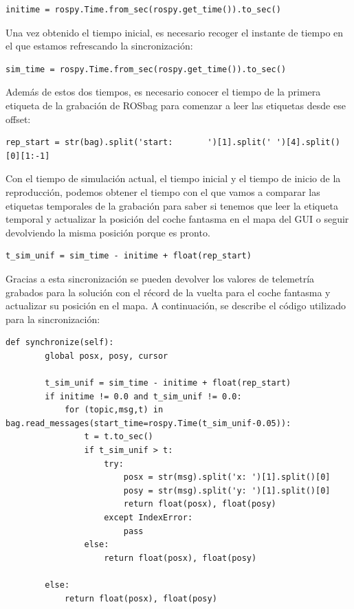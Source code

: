\lstset{language=Python, breaklines=true, basicstyle=\footnotesize}
\begin{lstlisting}[frame=single]
initime = rospy.Time.from_sec(rospy.get_time()).to_sec()
\end{lstlisting}

Una vez obtenido el tiempo inicial, es necesario recoger el instante de tiempo en el que estamos refrescando la sincronización:

\lstset{language=Python, breaklines=true, basicstyle=\footnotesize}
\begin{lstlisting}[frame=single]
sim_time = rospy.Time.from_sec(rospy.get_time()).to_sec()
\end{lstlisting}

Además de estos dos tiempos, es necesario conocer el tiempo de la primera etiqueta de la grabación de ROSbag para comenzar a leer las etiquetas desde ese offset:
\lstset{language=Python, breaklines=true, basicstyle=\footnotesize}
\begin{lstlisting}[frame=single]
rep_start = str(bag).split('start:       ')[1].split(' ')[4].split()[0][1:-1]
\end{lstlisting}
Con el tiempo de simulación actual, el tiempo inicial y el tiempo de inicio de la reproducción, podemos obtener el tiempo con el que vamos a comparar las etiquetas temporales de la grabación para saber si tenemos que leer la etiqueta temporal y actualizar la posición del coche fantasma en el mapa del GUI o seguir devolviendo la misma posición porque es pronto.

\lstset{language=Python, breaklines=true, basicstyle=\footnotesize}
\begin{lstlisting}[frame=single]
t_sim_unif = sim_time - initime + float(rep_start)
\end{lstlisting}

Gracias a esta sincronización se pueden devolver los valores de telemetría grabados para la solución con el récord de la vuelta para el coche fantasma y actualizar su posición en el mapa. A continuación, se describe el código utilizado para la sincronización:

\lstset{language=Python, breaklines=true, basicstyle=\footnotesize}
\begin{lstlisting}[frame=single]
def synchronize(self):
        global posx, posy, cursor

        t_sim_unif = sim_time - initime + float(rep_start)
        if initime != 0.0 and t_sim_unif != 0.0:
            for (topic,msg,t) in bag.read_messages(start_time=rospy.Time(t_sim_unif-0.05)):
                t = t.to_sec()
                if t_sim_unif > t:
                    try:
                        posx = str(msg).split('x: ')[1].split()[0]
                        posy = str(msg).split('y: ')[1].split()[0]
                        return float(posx), float(posy)
                    except IndexError:
                        pass
                else:
                    return float(posx), float(posy)

        else:
            return float(posx), float(posy)
\end{lstlisting}

